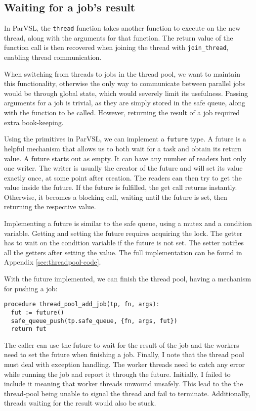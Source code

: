 \subsection{Waiting for a job's result}
\label{ssec:waitjob}

In ParVSL, the \texttt{thread} function takes another function to execute on the new thread,
along with the arguments for that function. The return value of the function call is
then recovered when joining the thread with \texttt{join\_thread}, enabling thread communication.

When switching from threads to jobs in the thread pool, we want to maintain this functionality,
otherwise the only way to communicate between parallel jobs would be through global state,
which would severely limit its usefulness. Passing arguments for a job is trivial, as they are simply
stored in the safe queue, along with the function to be called. However, returning the result of
a job required extra book-keeping.

Using the primitives in ParVSL, we can implement a \texttt{future} type. A future is a helpful mechanism
that allows us to both wait for a task and obtain its return value. A future starts out as empty.
It can have any number of readers but only one writer. The writer is usually the creator of the future
and will set its value exactly once, at some point after creation. The readers can then try to get the
value inside the future. If the future is fulfilled, the get call returns instantly. Otherwise, it
becomes a blocking call, waiting until the future is set, then returning the respective value.

Implementing a future is similar to the safe queue, using a mutex and a condition variable.
Getting and setting the future requires acquiring the lock. The getter has to wait on the condition
variable if the future is not set. The setter notifies all the getters after setting the value.
The full implementation can be found in Appendix \ref{sec:threadpool-code}.

With the future implemented, we can finish the thread pool, having a mechanism for pushing a job:

\begin{verbatim}
procedure thread_pool_add_job(tp, fn, args):
  fut := future()
  safe_queue_push(tp.safe_queue, {fn, args, fut})
  return fut
\end{verbatim}

The caller can use the future to wait for the result of the job and the workers need to set the future
when finishing a job. Finally, I note that the thread pool must deal with exception handling. The worker threads
need to catch any error while running the job and report it through the future. Initially, I failed to include
it meaning that worker threads unwound unsafely. This lead to the the thread-pool being unable to signal the
thread and fail to terminate. Additionally, threads waiting for the result would also be stuck.

